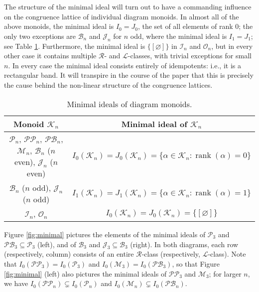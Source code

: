 \documentclass[11pt,a4paper]{article}
\renewcommand{\arraystretch}{1.2}
\newcommand{\PP}{\mathscr{P}\P}
\newcommand{\M}{\mathcal M}
\renewcommand{\O}{\mathcal O}
\newcommand{\I}{\mathcal I}
\newcommand{\B}{\mathcal B}
\renewcommand{\P}{\mathcal P}
\newcommand{\PB}{\mathcal{PB}}
\newcommand{\J}{\mathcal J}
\renewcommand{\L}{\mathrel{\mathscr L}}
\newcommand{\R}{\mathrel{\mathscr R}}
\newcommand{\al}{\alpha}
\newcommand{\rank}{\operatorname{rank}}
\newcommand{\set}[2]{\{ {#1} : {#2} \}}
\renewcommand{\emptyset}{\varnothing}
\newcommand{\1}{\id_n}
\newcommand{\sub}{\subseteq}
\numberwithin{equation}{section}
\theoremstyle{definition}
\begin{document}
The structure of the minimal ideal will turn out to have a commanding influence on the congruence lattice of individual diagram monoids.  In almost all of the above monoids, the minimal ideal is $I_0=J_0$, the set of all elements of rank $0$; the only two exceptions are $\B_n$ and $\J_n$ for $n$ odd, where the minimal ideal is $I_1=J_1$; see Table \ref{tab:minimal}.  Furthermore, the minimal ideal is $\{[\emptyset]\}$ in $\I_n$ and $\O_n$, but in every other case it contains multiple $\R$- and $\L$-classes, with trivial exceptions for small $n$.  In every case the minimal ideal consists entirely of idempotents: i.e., it is a rectangular band.  It will transpire in the course of the paper that this is precisely the cause behind the non-linear structure of the congruence lattices.

\begin{table}[H]
\begin{center}
\renewcommand{\arraystretch}{1.8}
\begin{tabular}{|c|c|}
\hline
Monoid $\mathcal{K}_n$ & Minimal ideal of $\mathcal{K}_n$ \\
\hline
$\P_n$, $\PP_n$, $\PB_n$, $\M_n$, $\B_n$ ($n$ even), $\J_n$ ($n$ even) & $I_0(\mathcal{K}_n) = J_0(\mathcal{K}_n) = \set{\al\in\mathcal{K}_n}{\rank(\al)=0}$ \\
$\B_n$ ($n$ odd), $\J_n$ ($n$ odd) & $I_1(\mathcal{K}_n) = J_1(\mathcal{K}_n) = \set{\al\in\mathcal{K}_n}{\rank(\al)=1}$ \\
$\I_n$, $\O_n$ & $I_0(\mathcal{K}_n) = J_0(\mathcal{K}_n) = \{[\emptyset]\}$ \\
\hline
\end{tabular}
\end{center}
\vspace{-5mm}
\caption{Minimal ideals of diagram monoids.}
\label{tab:minimal}
\end{table}


Figure \ref{fig:minimal} pictures the elements of the minimal ideals of $\P_3$ and $\PB_3\sub\P_3$ (left), and of $\B_3$ and $\J_3\sub\B_3$ (right).  In both diagrams, each row (respectively, column) consists of an entire $\R$-class (respectively, $\L$-class).  Note that $I_0(\PP_3)=I_0(\P_3)$ and $I_0(\M_3)=I_0(\PB_3)$, so that Figure \ref{fig:minimal} (left) also pictures the minimal ideals of $\PP_3$ and $\M_3$; for larger $n$, we have $I_0(\PP_n)\subsetneq I_0(\P_n)$ and $I_0(\M_n)\subsetneq I_0(\PB_n)$.
\end{document}
